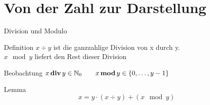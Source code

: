 %
%

\section{Von der Zahl zur Darstellung}
\begin{frame}{Division und Modulo}
	\begin{block}{Definition}
		$ x \div y$ ist die ganzzahlige Division von x durch y.\\
		$ x \mod y$ liefert den Rest dieser Division
	\end{block} 
	\pause
	
	\begin{block}{Beobachtung}
		$ x\mathop{\textbf{div}} y \in \mathbb{N}_0 \qquad x\mathop{\textbf{mod}} y \in \{0,\dots, y-1\} $
	\end{block}
	\pause
	
	\begin{block}{Lemma}
		$$ x = y \cdot (x \div y ) + \left( x \mod y \right)$$ 
	\end{block}
	
\end{frame}

